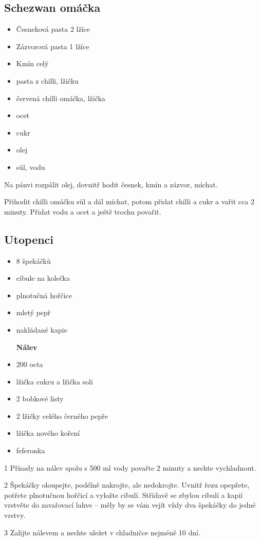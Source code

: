 \documentclass[10pt,a4paper]{article}
\newenvironment{myitemize}
{ \begin{itemize}
    \setlength{\itemsep}{0pt}
    \setlength{\parskip}{0pt}
    \setlength{\parsep}{0pt}     }
{ \end{itemize}                  }
\begin{document}
\subsection{Schezwan omáčka}
\begin{minipage}[t]{0,5\textwidth}
\begin{myitemize} 
\item Česneková pasta 2 lžíce
\item Zázvorová pasta 1 lžíce
\item Kmín celý
\item pasta z chilli, lžičku
\item červená chilli omáčka, lžička
\item ocet
\item cukr
\item olej
\item sůl, vodu
\end{myitemize}
\end{minipage}
\begin{minipage}[t]{0,5\textwidth}
Na pánvi rozpálit olej, dovnitř hodit česnek, kmín a zázvor, míchat.

Přihodit chilli omáčku sůl a dál míchat, potom přidat chilli a cukr a vařit cca 2 minuty. Přidat vodu a ocet a ještě trochu povařit.
\end{minipage}

\subsection{Utopenci}
\begin{minipage}[t]{0,5\textwidth}
\begin{myitemize} 
\item 8 špekáčků
\item cibule na kolečka
\item plnotučná hořčice
\item mletý pepř
\item nakládané kapie

\textbf{Nálev}
\item 200 octa
\item lžička cukru a lžička soli
\item 2 bobkové listy
\item 2 lžičky celého černého pepře
\item lžička nového koření
\item feferonka
\end{myitemize}
\end{minipage}
\begin{minipage}[t]{0,5\textwidth}
1 Přísady na nálev spolu s 500 ml vody povařte 2 minuty a nechte vychladnout.

2 Špekáčky oloupejte, podélně nakrojte, ale nedokrojte. Uvnitř řezu opepřete, potřete plnotučnou hořčicí a vyložte cibulí. Střídavě se zbylou cibulí a kapií vrstvěte do zavařovací lahve – měly by se vám vejít vždy dva špekáčky do jedné vrstvy.

3 Zalijte nálevem a nechte uležet v chladničce nejméně 10 dní.
\end{minipage}
\pagebreak
\end{document}
